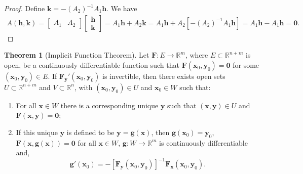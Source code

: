 \documentclass{article}
\newcommand{\R}{\mathbb{R}}
\newcommand{\x}{\mathbf{x}}
\newcommand{\y}{\mathbf{y}}
\newcommand{\h}{\mathbf{h}}
\newcommand{\g}{\mathbf{g}}
\newcommand{\ze}{\mathbf{0}}
\theoremstyle{definition}
\newtheorem{theorem}{Theorem}[section]
\begin{document}
\begin{proof}
	Define $ \mathbf k = -(A_2)^{-1}A_1 \h$. We have 
	\begin{align*}
		A(\h,\mathbf k) = \begin{bmatrix}A_1&A_2\end{bmatrix}\begin{bmatrix}
			\mathbf h\\ \mathbf k
		\end{bmatrix} = A_1\h + A_2\mathbf k = A_1\h + A_2[-(A_2)^{-1}A_1 \h] = A_1\h - A_1\h = \ze.
	\end{align*} 
\end{proof}
\begin{theorem}[Implicit Function Theorem]
	Let $ \mathbf F:E\to \R^{m} $, where $ E\subset  \R^{n+m}$ is open, be a continuously differentiable function such that $ \mathbf F(\x_0,\y_0) =\ze $ for some $ (\x_0,\y_0)\in E $. If $ \mathbf F_\y'(\x_0,\y_0) $ is invertible, then there exists open sets $ U\subset \R^{n+m} $ and $ V\subset \R^n $, with $ (\x_0,\y_0)\in U $ and $ \x_0\in W $ such that:
	\begin{enumerate}
		\item For all $ \x\in W $ there is a corresponding unique $ \y $ such that $ (\x,\y)\in U $ and $ \mathbf F(\x,\y) = \ze $;
		\item If this unique $ \y $ is defined to be $ \y = \mathbf g(\x) $, then $ \g(\x_0)=\y_0 $, $ \mathbf F(\x,\g(\x))=\ze $ for all $ \x\in W $,  $ \mathbf g:W\to\R^m $ is continuously differentiable and,
		$$ \g'(\x_0) = -[\mathbf F_\y(\x_0,\y_0)]^{-1}\mathbf F_\x(\x_0,\y_0).$$ 
	\end{enumerate} 
\end{theorem}
\end{document}
